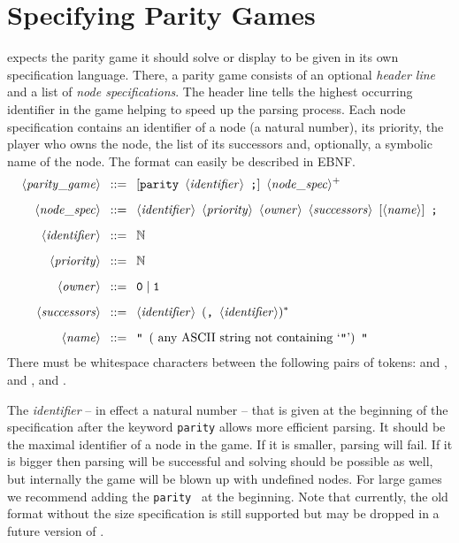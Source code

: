 \section{Specifying Parity Games}
\label{sec:specs}

\pgsolver expects the parity game it should solve or display to be given in its own
specification language. There, a parity game consists of an optional \emph{header line} and
a list of \emph{node specifications}. The header line tells \pgsolver the highest
occurring identifier in the game helping to speed up the parsing process. Each
node specification contains an identifier of a node (a natural number), its priority, the
player who owns the node, the list of its successors and, optionally, a symbolic
name of the node. The format can easily be described in EBNF. 
\begin{align*}
\langle\mathit{parity\_game}\rangle \enspace &::= \enspace [\texttt{parity} \enspace \langle\mathit{identifier}\rangle \enspace \texttt{;}] \enspace \langle\mathit{node\_spec}\rangle^+ \\[2mm]
\langle\mathit{node\_spec}\rangle \enspace &::= \enspace \langle\mathit{identifier}\rangle \enspace
  \langle\mathit{priority}\rangle \enspace \langle\mathit{owner}\rangle \enspace \langle\mathit{successors}\rangle
  \enspace [\langle\mathit{name}\rangle] \enspace \texttt{;} \\[2mm]
\langle\mathit{identifier}\rangle \enspace &::= \enspace \mathbb{N} \\[2mm]
\langle\mathit{priority}\rangle \enspace &::= \enspace \mathbb{N} \\[2mm]
\langle\mathit{owner}\rangle \enspace &::= \enspace \texttt{0} \mid \texttt{1} \\[2mm]
\langle\mathit{successors}\rangle \enspace &::= \enspace \langle\mathit{identifier}\rangle\enspace
  (\texttt{,}\enspace \langle\mathit{identifier}\rangle)^* \\[2mm]
\langle\mathit{name}\rangle \enspace &::= \enspace \texttt{"}\enspace
  (\mbox{ any ASCII string not containing `{\texttt{"}}'}) \enspace \texttt{"}
\end{align*}
There must be whitespace characters between the following pairs of tokens:
 and ,  and ,
 and .

The \textit{identifier} -- in effect a natural number -- that is given at the beginning of
the specification after the keyword \texttt{parity} allows more efficient parsing. It should be the
maximal identifier of a node in the game. If it is smaller, parsing will fail. If it is bigger
then parsing will be successful and solving should be possible as well, but internally the game
will be blown up with undefined nodes. For large games we recommend adding the 
\texttt{parity}\  at the beginning. Note that currently, the old format
without the size specification is still supported but may be dropped in a future version of
\pgsolver.

